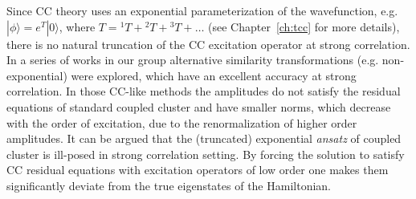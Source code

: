 Since CC theory uses an exponential parameterization 
of the wavefunction, e.g. $|\phi \rangle = e^{T} | 0 \rangle$, where $T = {}^1T 
+ {}^2T + {}^3T + \ldots$ (see Chapter~\ref{ch:tcc} for more details), there is 
no natural truncation of the CC excitation operator at strong correlation. 
In a series of works in our group\cite{degroote2016polynomial, 
gomez2017attenuated, qiu2017projected2, hermes2017combining} alternative 
similarity transformations (e.g. non-exponential) were explored, 
which have an excellent accuracy at strong correlation. In those CC-like methods 
the amplitudes do not satisfy the residual equations of standard coupled 
cluster and have smaller norms, which decrease with the order of excitation, due 
to the renormalization of higher order amplitudes. It can be argued that the 
(truncated) exponential \emph{ansatz} of coupled cluster is ill-posed in strong 
correlation setting. By forcing the solution to satisfy CC residual equations 
with excitation operators of low order one makes them significantly deviate from 
the true eigenstates of the Hamiltonian.

